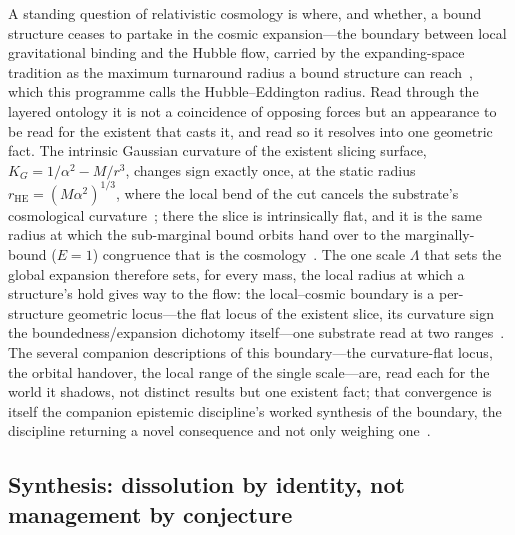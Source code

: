 \documentclass[11pt,a4paper]{article}
\theoremstyle{plain}
\theoremstyle{definition}
\theoremstyle{remark}
\begin{document}
A standing question of relativistic cosmology is where, and whether, a bound structure ceases to partake in the cosmic expansion---the boundary between local gravitational binding and the Hubble flow, carried by the expanding-space tradition as the maximum turnaround radius a bound structure can reach~\cite{PavlidouTomaras2014}, which this programme calls the Hubble--Eddington radius. Read through the layered ontology it is not a coincidence of opposing forces but an appearance to be read for the existent that casts it, and read so it resolves into one geometric fact. The intrinsic Gaussian curvature of the existent slicing surface, $K_G=1/\alpha^2-M/r^3$, changes sign exactly once, at the static radius $r_{\mathrm{HE}}=(M\alpha^2)^{1/3}$, where the local bend of the cut cancels the substrate's cosmological curvature~\cite{JanzenSlicing}; there the slice is intrinsically flat, and it is the same radius at which the sub-marginal bound orbits hand over to the marginally-bound ($E=1$) congruence that is the cosmology~\cite{JanzenOperator}. The one scale $\Lambda$ that sets the global expansion therefore sets, for every mass, the local radius at which a structure's hold gives way to the flow: the local--cosmic boundary is a per-structure geometric locus---the flat locus of the existent slice, its curvature sign the boundedness/expansion dichotomy itself---one substrate read at two ranges~\cite{JanzenCRcosmology,JanzenGeometricCore}. The several companion descriptions of this boundary---the curvature-flat locus, the orbital handover, the local range of the single scale---are, read each for the world it shadows, not distinct results but one existent fact; that convergence is itself the companion epistemic discipline's worked synthesis of the boundary, the discipline returning a novel consequence and not only weighing one~\cite{JanzenShadowExistence}.

\subsection{Synthesis: dissolution by identity, not management by conjecture}\label{sec:applications-synthesis}
\end{document}
